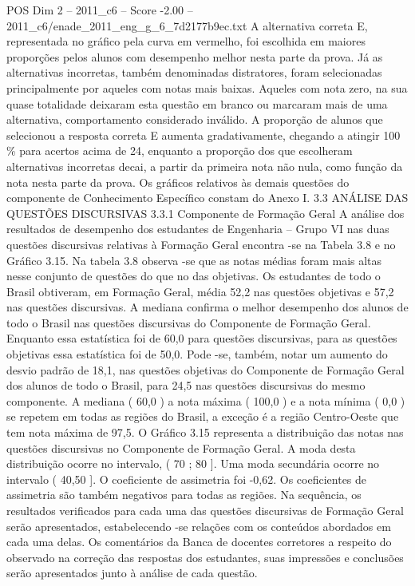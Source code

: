 \begin{textsample}{POS Dim 2 – 2011\_c6 – Score -2.00 – 2011\_c6/enade\_2011\_eng\_g\_6\_7d2177b9ec.txt}
A alternativa correta E, representada no gráfico pela curva em vermelho, foi escolhida em maiores proporções pelos alunos com desempenho melhor nesta parte da prova.
Já as alternativas incorretas, também denominadas distratores, foram selecionadas principalmente por aqueles com notas mais baixas.
Aqueles com nota zero, na sua quase totalidade deixaram esta questão em branco ou marcaram mais de uma alternativa, comportamento considerado inválido.
A proporção de alunos que selecionou a resposta correta E aumenta gradativamente, chegando a atingir 100 \% para acertos acima de 24, enquanto a proporção dos que escolheram alternativas incorretas decai, a partir da primeira nota não nula, como função da nota nesta parte da prova.
Os gráficos relativos às demais questões do componente de Conhecimento Específico constam do Anexo I. 3.3 ANÁLISE DAS QUESTÕES DISCURSIVAS 3.3.1 Componente de Formação Geral A análise dos resultados de desempenho dos estudantes de Engenharia – Grupo VI nas duas questões discursivas relativas à Formação Geral encontra -se na Tabela 3.8 e no Gráfico 3.15.
Na tabela 3.8 observa -se que as notas médias foram mais altas nesse conjunto de questões do que no das objetivas.
Os estudantes de todo o Brasil obtiveram, em Formação Geral, média 52,2 nas questões objetivas e 57,2 nas questões discursivas.
A mediana confirma o melhor desempenho dos alunos de todo o Brasil nas questões discursivas do Componente de Formação Geral.
Enquanto essa estatística foi de 60,0 para questões discursivas, para as questões objetivas essa estatística foi de 50,0.
Pode -se, também, notar um aumento do desvio padrão de 18,1, nas questões objetivas do Componente de Formação Geral dos alunos de todo o Brasil, para 24,5 nas questões discursivas do mesmo componente.
A mediana ( 60,0 ) a nota máxima ( 100,0 ) e a nota mínima ( 0,0 ) se repetem em todas as regiões do Brasil, a exceção é a região Centro-Oeste que tem nota máxima de 97,5.
O Gráfico 3.15 representa a distribuição das notas nas questões discursivas no Componente de Formação Geral.
A moda desta distribuição ocorre no intervalo, ( 70 ; 80 ].
Uma moda secundária ocorre no intervalo ( 40,50 ].
O coeficiente de assimetria foi -0,62.
Os coeficientes de assimetria são também negativos para todas as regiões.
Na sequência, os resultados verificados para cada uma das questões discursivas de Formação Geral serão apresentados, estabelecendo -se relações com os conteúdos abordados em cada uma delas.
Os comentários da Banca de docentes corretores a respeito do observado na correção das respostas dos estudantes, suas impressões e conclusões serão apresentados junto à análise de cada questão.

\end{textsample}
